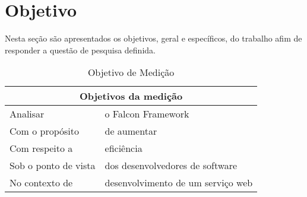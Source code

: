 \chapter{Objetivo}\label{cap2}

Nesta seção são apresentados os objetivos, geral e específicos, do trabalho afim de responder a questão de pesquisa definida.

\begin{table}[H]
\centering
\caption{Objetivo de Medição}
\label{my-label}
\begin{tabular}{ll}
\hline
\multicolumn{2}{c}{Objetivos da medição}                 \\ \hline
Analisar             & o Falcon Framework                \\
Com o propósito      & de aumentar                       \\
Com respeito a       & eficiência                        \\
Sob o ponto de vista & dos desenvolvedores de software   \\
No contexto de       & desenvolvimento de um serviço web \\ \hline
\end{tabular}
\end{table}
